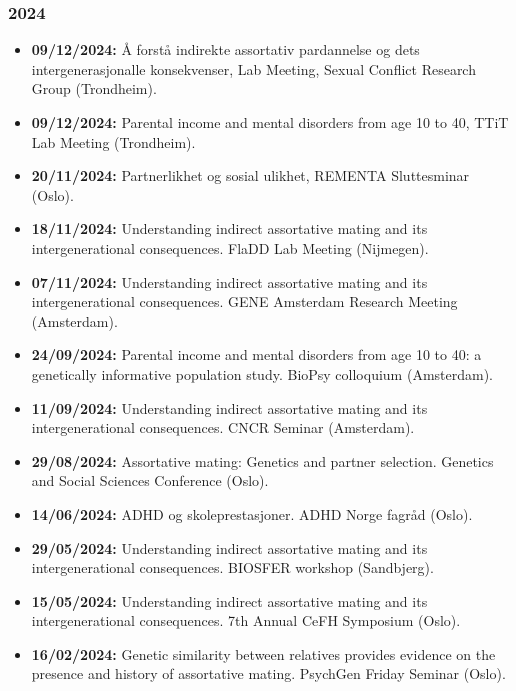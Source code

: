 \documentclass[10pt,a4paper]{article}
\begin{document}
\subsubsection*{2024}
\begin{itemize}
\item \textbf{09/12/2024:} Å forstå indirekte assortativ pardannelse og dets intergenerasjonalle konsekvenser, Lab Meeting, Sexual Conflict Research Group (Trondheim).
\item \textbf{09/12/2024:} Parental income and mental disorders from age 10 to 40, TTiT Lab Meeting (Trondheim).
\item \textbf{20/11/2024:} Partnerlikhet og sosial ulikhet, REMENTA Sluttesminar (Oslo).
\item \textbf{18/11/2024:} Understanding indirect assortative mating and its intergenerational consequences. FlaDD Lab Meeting (Nijmegen).
\item \textbf{07/11/2024:} Understanding indirect assortative mating and its intergenerational consequences. GENE Amsterdam Research Meeting (Amsterdam).
\item \textbf{24/09/2024:} Parental income and mental disorders from age 10 to 40: a genetically informative population study. BioPsy colloquium (Amsterdam).
\item \textbf{11/09/2024:} Understanding indirect assortative mating and its intergenerational consequences. CNCR Seminar (Amsterdam).
\item \textbf{29/08/2024:} Assortative mating: Genetics and partner selection. Genetics and Social Sciences Conference (Oslo).
\item \textbf{14/06/2024:} ADHD og skoleprestasjoner. ADHD Norge fagråd (Oslo).
\item \textbf{29/05/2024:} Understanding indirect assortative mating and its intergenerational consequences. BIOSFER workshop (Sandbjerg).
\item \textbf{15/05/2024:} Understanding indirect assortative mating and its intergenerational consequences. 7th Annual CeFH Symposium (Oslo).
\item \textbf{16/02/2024:} Genetic similarity between relatives provides evidence on the presence and history of assortative mating. PsychGen Friday Seminar (Oslo).
\end{itemize}
\end{document}
